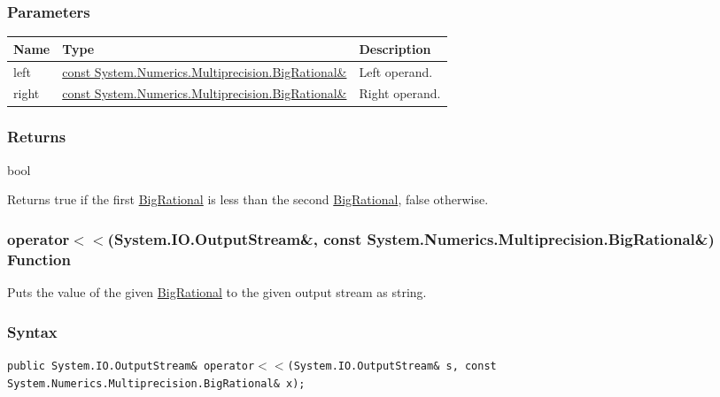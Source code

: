 \documentclass[a4paper,oneside,11.000000pt]{book}
\begin{document}
\subsubsection*{Parameters}
\begin{flushleft}
\begin{supertabular}[l]{!{\raggedright}p{1.30721cm}!{\raggedright}p{8.55945cm}!{\raggedright}p{3.66839cm}}
\textbf{Name}
& \textbf{Type}
& \textbf{Description}
\\
\hline
left
& \hyperlink{System.Numerics.Multiprecision.BigRational}{const System.\-Numerics.\-Multiprecision.\-BigRational\&\-}
& Left operand.

\\
right
& \hyperlink{System.Numerics.Multiprecision.BigRational}{const System.\-Numerics.\-Multiprecision.\-BigRational\&\-}
& Right operand.

\\
\end{supertabular}

\end{flushleft}
\subsubsection*{Returns}bool
\begin{flushleft}
Returns true if the first \hyperlink{System.Numerics.Multiprecision.BigRational}{BigRational} is less than the second \hyperlink{System.Numerics.Multiprecision.BigRational}{BigRational}, false otherwise.

\end{flushleft}
\clearpage

\hypertarget{System.Numerics.Multiprecision.operator.shiftLeft.R.System.IO.OutputStream.C.R.System.Numerics.Multiprecision.BigRational}{\subsubsection*{operator$<$$<$(System.IO.OutputStream\&, const System.Numerics.Multiprecision.BigRational\&) Function}}
\begin{flushleft}
Puts the value of the given \hyperlink{System.Numerics.Multiprecision.BigRational}{BigRational} to the given output stream as string.

\end{flushleft}
\subsubsection*{Syntax}
\texttt{public System.IO.OutputStream\& operator$<$$<$(System.IO.OutputStream\& s, const System.Numerics.Multiprecision.BigRational\& x);}
\end{document}
